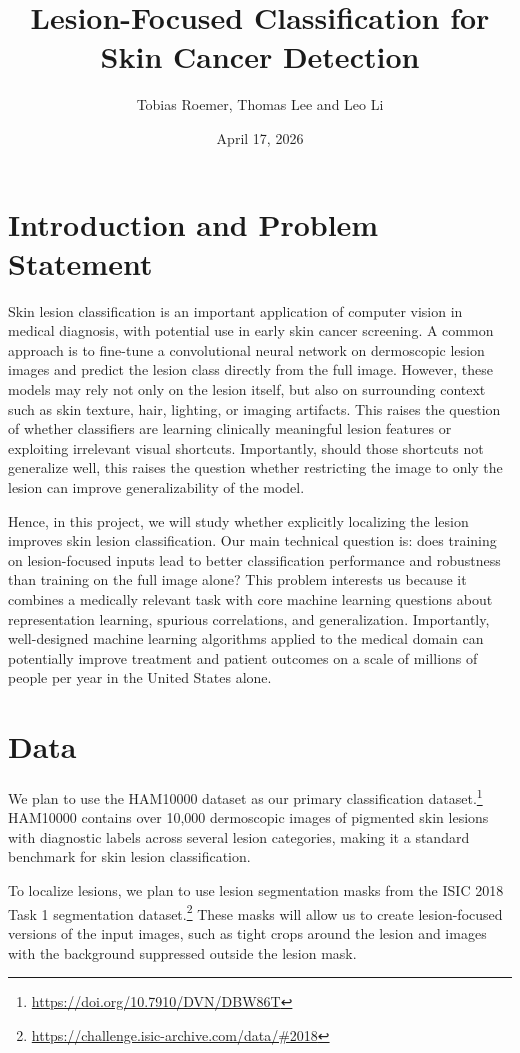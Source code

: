 \documentclass{article}
\title{Lesion-Focused Classification for Skin Cancer Detection}
\author{Tobias Roemer, Thomas Lee and Leo Li}
\date{April 17, 2026}
\begin{document}
\maketitle

\section*{Introduction and Problem Statement}
Skin lesion classification is an important application of computer vision in medical diagnosis, with potential use in early skin cancer screening. A common approach is to fine-tune a convolutional neural network on dermoscopic lesion images and predict the lesion class directly from the full image. However, these models may rely not only on the lesion itself, but also on surrounding context such as skin texture, hair, lighting, or imaging artifacts. This raises the question of whether classifiers are learning clinically meaningful lesion features or exploiting irrelevant visual shortcuts. Importantly, should those shortcuts not generalize well, this raises the question whether restricting the image to only the lesion can improve generalizability of the model.

Hence, in this project, we will study whether explicitly localizing the lesion improves skin lesion classification. Our main technical question is: does training on lesion-focused inputs lead to better classification performance and robustness than training on the full image alone? This problem interests us because it combines a medically relevant task with core machine learning questions about representation learning, spurious correlations, and generalization. Importantly, well-designed machine learning algorithms applied to the medical domain can potentially improve treatment and patient outcomes on a scale of millions of people per year in the United States alone.

\section*{Data}
We plan to use the HAM10000 dataset as our primary classification dataset.\footnote{\url{https://doi.org/10.7910/DVN/DBW86T}} HAM10000 contains over 10,000 dermoscopic images of pigmented skin lesions with diagnostic labels across several lesion categories, making it a standard benchmark for skin lesion classification.

To localize lesions, we plan to use lesion segmentation masks from the ISIC 2018 Task 1 segmentation dataset.\footnote{\url{https://challenge.isic-archive.com/data/#2018}} These masks will allow us to create lesion-focused versions of the input images, such as tight crops around the lesion and images with the background suppressed outside the lesion mask.
\end{document}
